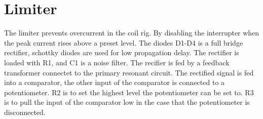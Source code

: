 



\section{Limiter}

The limiter prevents overcurrent in the coil rig. By disabling the interrupter when the peak current rises above a preset level. The diodes D1-D4 is a full bridge rectifier, schottky diodes are used for low propagation delay. The rectifier is loaded with R1, and C1 is a noise filter. The recifier is fed by a feedback transformer connectet to the primary resonant circuit. The rectified signal is fed into a comparator, the other input of the comparator is connected to a potentiometer. R2 is to set the highest level the potentiometer can be set to. R3 is to pull the input of the comparator low in the case that the potentiometer is disconnected.

